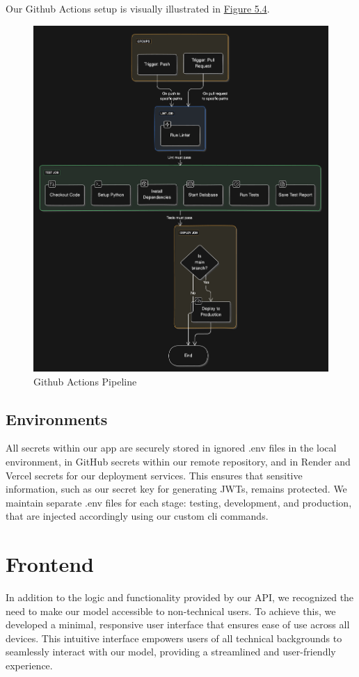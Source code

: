 Our Github Actions setup is visually illustrated in \hyperref[fig:backend-cicd]{Figure 5.4}.
\begin{figure}[ht]
    \centering
    \includegraphics[width=\linewidth]{images/webapp/backend/cicd.png}
    \caption{Github Actions Pipeline}
    \label{fig:backend-cicd}
\end{figure}


\subsection{Environments}
All secrets within our app are securely stored in ignored .env files in the local environment, in GitHub secrets within our remote repository, and in Render and Vercel secrets for our deployment services. This ensures that sensitive information, such as our secret key for generating JWTs, remains protected. We maintain separate .env files for each stage: testing, development, and production, that are injected accordingly using our custom cli commands.

\section{Frontend}
In addition to the logic and functionality provided by our API, we recognized the need to make our model accessible to non-technical users. To achieve this, we developed a minimal, responsive user interface that ensures ease of use across all devices. This intuitive interface empowers users of all technical backgrounds to seamlessly interact with our model, providing a streamlined and user-friendly experience.

